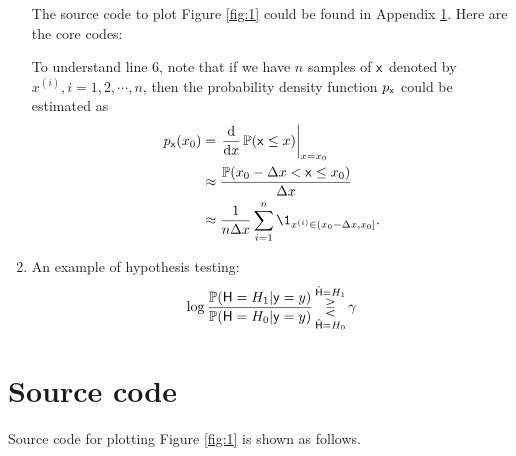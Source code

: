 \documentclass[a4paper]{article}
\begin{document}
\begin{enumerate}
  The source code to plot Figure \ref{fig:1} could be found in Appendix \ref{sec:a:code}. Here are the core codes:
  
  
  To understand line 6, note that if we have $n$ samples of $\mathsf{x}$ denoted by $x^{(i)}, i = 1, 2, \cdots, n$, then the probability density function $p_{\mathsf{x}}$ could be estimated as
  \begin{equation*}
    \begin{aligned}
      p_{\rvx}(x_0) &= \left.\frac{\mathrm{d}}{\mathrm{d}x} \Prob(\rvx \leq x) \right|_{x = x_0} \\
      &\approx \frac{\Prob(x_0 - \Delta x < \rvx \leq x_0)}{\Delta x}\\
      &\approx \frac{1}{n\Delta x} \sum_{i = 1}^n \1_{x^{(i)} \in (x_0 - \Delta x, x_0]}.
    \end{aligned}    
  \end{equation*}
  
\item An example of hypothesis testing:
  \begin{equation*}
   \log \frac{\operatorname{\mathbb{P}}(\mathsf{H} = H_1|\mathsf{y} = y)}{\operatorname{\mathbb{P}}(\mathsf{H} = H_0|\mathsf{y} = y)} 
   \mathop{\gtreqless}_{\hat{\mathsf{H}} = H_0}^{\hat{\mathsf{H}} = H_1} \gamma
  \end{equation*}
  
  \end{enumerate}

  
  \newpage
  
  \appendix
  \section{Source code}
  \label{sec:a:code}
  Source code for plotting Figure \ref{fig:1} is shown as follows.
  
  
\end{document}
